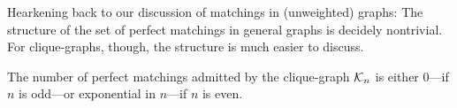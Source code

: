 
\medskip

Hearkening back to our discussion of matchings in (unweighted) graphs: The structure of the set of perfect matchings in general graphs is decidely nontrivial.  For clique-graphs, though, the structure is much easier to discuss.

\begin{prop}
\label{thm:perfect-matchings-clique}
The number of perfect matchings admitted by the clique-graph $\mbox{$\cal K$}_n$ is either $0$---if $n$ is odd---or exponential in $n$---if $n$ is even.
\end{prop}

